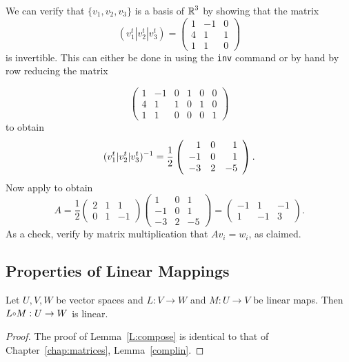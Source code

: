 \documentclass{ximera}
\begin{document}
We can verify that $\{v_1,v_2,v_3\}$ is a basis of $\mbox{$\Bbb{R}$}^3$ by
showing that the matrix
\[
(v_1^t|v_2^t|v_3^t) = \left(\begin{array}{rrr}
1 & -1 & 0  \\
4 & 1 & 1  \\
1 & 1 & 0  \end{array}\right)
\]
is invertible.  This can either be done in \Matlab using the
{\tt inv} command or by hand by row reducing the matrix

\[
\left(\begin{array}{rrr|ccc}
1 & -1 & 0 & 1 & 0 & 0 \\
4 &  1 & 1 & 0 & 1 & 0 \\
1 &  1 & 0 & 0 & 0 & 1  \end{array}\right)
\]
to obtain
\[
(v_1^t|v_2^t|v_3^t)^{-1} = \frac{1}{2}\left(\begin{array}{rrr}
 1 & 0 &  1 \\
-1 & 0 &  1 \\
-3 & 2 & -5
\end{array}\right).
\]
Now apply  to obtain
\[
A = \frac{1}{2} \left(\begin{array}{rrr} 2 & 1 & 1\\ 0 & 1 & -1
\end{array}\right) \left(\begin{array}{rrr}
 1 & 0 &  1 \\
-1 & 0 &  1 \\
-3 & 2 & -5
\end{array}\right) = \left(\begin{array}{rrr} -1 & 1 & -1 \\ 1 & -1 & 3
\end{array}\right).
\]
As a check, verify by matrix multiplication that $Av_i=w_i$, as claimed.


\subsection*{Properties of Linear Mappings}

\begin{lemma} \label{L:compose}
Let $U,V,W$ be vector spaces and $L:V\to W$ and $M:U\to V$ be linear maps.
Then $L\compose M :U\to W$ is linear.
\end{lemma}

\begin{proof} The proof of Lemma~\ref{L:compose} is identical to that of
Chapter~\ref{chap:matrices}, Lemma~\ref{complin}. \end{proof}
\end{document}
